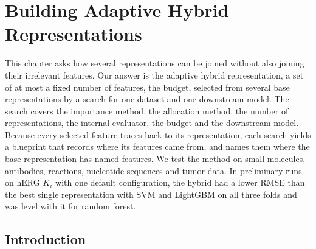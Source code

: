 \chapter{Building Adaptive Hybrid Representations}\label{chap:method}

This chapter asks how several representations can be joined without also joining their irrelevant features. Our answer is the adaptive hybrid representation, a set of at most a fixed number of features, the budget, selected from several base representations by a search for one dataset and one downstream model. The search covers the importance method, the allocation method, the number of representations, the internal evaluator, the budget and the downstream model. Because every selected feature traces back to its representation, each search yields a blueprint that records where its features came from, and names them where the base representation has named features. We test the method on small molecules, antibodies, reactions, nucleotide sequences and tumor data. In preliminary runs on hERG $K_i$ with one default configuration, the hybrid had a lower RMSE than the best single representation with SVM and LightGBM on all three folds and was level with it for random forest.


\section{Introduction}

